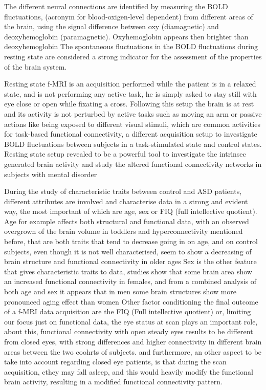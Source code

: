 \documentclass[11pt]{report}
\begin{document}
The different neural connections are identified by measuring the BOLD fluctuations, (acronym for blood-oxigen-level dependent) from different areas of the brain, using the signal difference between oxy (diamagnetic) and deoxyhemoglobin (paramagnetic).
Oxyhemoglobin appears then brighter than deoxyhemoglobin
The spontaneous fluctuations in the BOLD fluctuations during resting state are considered a strong indicator for the assessment of the properties of the brain system.

Resting state f-MRI is an acquisition performed while the patient is in a relaxed state, and is not performing any active task, he is simply asked to stay still with eye close or open while fixating a cross.
Following this setup the brain is at rest and its activity is not perturbed by active tasks such as moving an arm or passive actions like being exposed to different visual stimuli, which are common activities for task-based functional connectivity, a different acquisition setup to investigate BOLD fluctuations between subjects in a task-stimulated state and control states.
Resting state setup revealed to be a powerful tool to investigate the intrinsec generated brain activity and study the altered functional connectivity networks in subjects with mental disorder


During the study of characteristic traits between control and ASD patients, different attributes are involved and characterise data in a strong and evident way, the most important of which are age, sex or FIQ (full intellective quotient).
Age for example affects both structural and functional data, with an observed overgrown of the brain volume in toddlers and hyperconnectivity mentioned before, that are both traits that tend to decrease going in on age, and on control subjects, even though it is not well characterised, seem to show a decreasing of brain structure and functional connectivity in older ages \cite{zhangC-2016}
Sex is the other feature that gives characteristic traits to data, studies show that some brain area show an increased functional connectivity in females, and from a combined analysis of both age and sex it appears that in men some brain structures show more pronounced aging effect than women
\cite{coffey-1998}
Other factor conditioning the final outcome of a f-MRI data acquisition are the FIQ (Full intellective quotient) or, limiting our focus just on functional data, the eye status at scan plays an important role, about this, functional connectivity with open steady eyes results to be different from closed eyes, with strong differences and higher connectivity in different brain areas between the two coohrts of subjects.
\cite{costumero-2020}
and furthermore, an other aspect to be take into account regarding closed eye patients, is that during the scan acquisition, cthey may fall asleep, and this would heavily modify the functional brain activity, resulting in a modified functional connectivity pattern.
\end{document}
